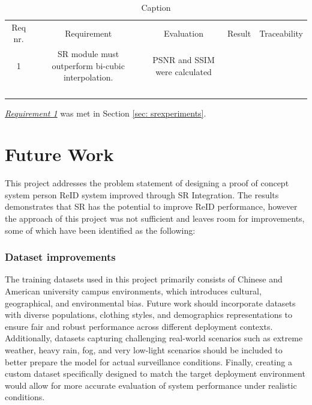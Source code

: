 \begin{table}
    \centering
    \begin{tabular}{|c|c|c|c|c|}
        Req nr. & Requirement & Evaluation & Result & Traceability \\
        1 & \acs{SR} module must outperform bi-cubic interpolation. & \acs{PSNR} and \acs{SSIM} were calculated&  & \\
         &  &  &  & \\
         &  &  &  & \\
         &  &  &  & \\
         &  &  &  & \\
    \end{tabular}
    \caption{Caption}
    \label{tab:placeholder}
\end{table}
\hyperlink{req:1}{\textit{Requirement 1}} was met in Section \ref{sec: srexperiments}. 

\section{Future Work}

This project addresses the problem statement of designing a proof of concept system person \acs{ReID} system improved through \acs{SR} Integration. The results demonstrates that \acs{SR} has the potential to improve \acs{ReID} performance, however the approach of this project was not sufficient and leaves room for improvements, some of which have been identified as the following: 

\subsubsection{Dataset improvements}
The training datasets used in this project primarily consists of Chinese and American university campus environments, which introduces cultural, geographical, and environmental bias. Future work should incorporate datasets with diverse populations, clothing styles, and demographics representations to ensure fair and robust performance across different deployment contexts. Additionally, datasets capturing challenging real-world scenarios such as extreme weather, heavy rain, fog, and very low-light scenarios should be included to better prepare the model for actual surveillance conditions. Finally, creating a custom dataset specifically designed to match the target deployment environment would allow for more accurate evaluation of system performance under realistic conditions.


